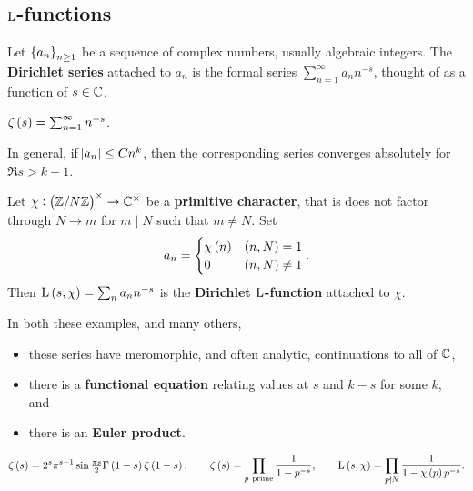 \pagebreak

\subsection{\texorpdfstring{$ \mathrm{L} $}{L}-functions}

\begin{definition}
Let $ \cbr{a_n}_{n \ge 1} $ be a sequence of complex numbers, usually algebraic integers. The \textbf{Dirichlet series} attached to $ a_n $ is the formal series $ \sum_{n = 1}^\infty a_nn^{-s} $, thought of as a function of $ s \in \mathbb{C} $.
\end{definition}

\begin{example*}
$ \zeta\br{s} = \sum_{n = 1}^\infty n^{-s} $.
\end{example*}

In general, if $ \abs{a_n} \le Cn^k $, then the corresponding series converges absolutely for $ \Re s > k + 1 $.

\begin{example*}
Let $ \chi : \unit{N} \to \CC^\times $ be a \textbf{primitive character}, that is does not factor through $ \unit{N} \to \unit{m} $ for $ m \mid N $ such that $ m \ne N $. Set
$$ a_n =
\begin{cases}
\chi\br{n} & \br{n, N} = 1 \\
0 & \br{n, N} \ne 1
\end{cases}.
$$
Then $ \L\br{s, \chi} = \sum_n a_nn^{-s} $ is the \textbf{Dirichlet $ \mathrm{L} $-function} attached to $ \chi $.
\end{example*}

In both these examples, and many others,
\begin{itemize}
\item these series have meromorphic, and often analytic, continuations to all of $ \mathbb{C} $,
\item there is a \textbf{functional equation} relating values at $ s $ and $ k - s $ for some $ k $, and
\item there is an \textbf{Euler product}.
\end{itemize}

\begin{example*}
$$ \zeta\br{s} = 2^s\pi^{s - 1}\sin \tfrac{\pi s}{2}\Gamma\br{1 - s}\zeta\br{1 - s}, \qquad \zeta\br{s} = \prod_{p \ \text{prime}} \dfrac{1}{1 - p^{-s}}, \qquad \L\br{s, \chi} = \prod_{p \nmid N} \dfrac{1}{1 - \chi\br{p}p^{-s}}. $$
\end{example*}

